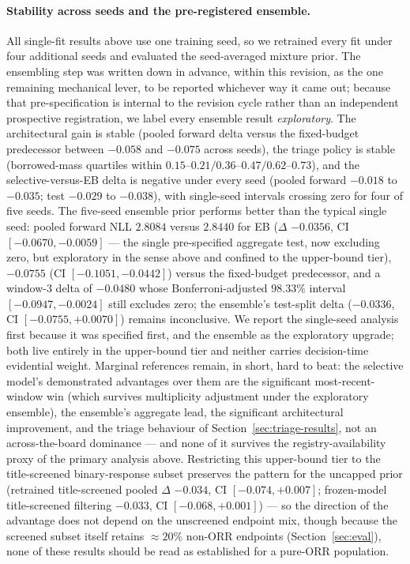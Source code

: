 \documentclass[11pt]{article}
\begin{document}
\paragraph{Stability across seeds and the pre-registered ensemble.} All
single-fit results above use one training seed, so we retrained every fit
under four additional seeds and evaluated the seed-averaged mixture prior.
The ensembling step was written down in advance, within this revision, as the
one remaining mechanical lever, to be reported whichever way it came out;
because that pre-specification is internal to the revision cycle rather than
an independent prospective registration, we label every ensemble result
\emph{exploratory}. The architectural
gain is stable (pooled forward delta versus the fixed-budget predecessor
between $-0.058$ and $-0.075$ across seeds), the triage policy is stable
(borrowed-mass quartiles within $0.15$--$0.21 / 0.36$--$0.47 / 0.62$--$0.73$),
and the selective-versus-EB delta is negative under every seed (pooled
forward $-0.018$ to $-0.035$; test $-0.029$ to $-0.038$), with single-seed
intervals crossing zero for four of five seeds. The five-seed ensemble prior
performs better than the typical single seed: pooled forward NLL $2.8084$
versus $2.8440$ for EB ($\Delta$ $-0.0356$, CI $[-0.0670,-0.0059]$ --- the
single pre-specified aggregate test, now excluding zero, but exploratory in
the sense above and confined to the upper-bound tier), $-0.0755$
(CI $[-0.1051,-0.0442]$) versus the fixed-budget predecessor, and a window-3
delta of $-0.0480$ whose Bonferroni-adjusted $98.33\%$ interval
$[-0.0947,-0.0024]$ still excludes zero; the ensemble's test-split delta
($-0.0336$, CI $[-0.0755,+0.0070]$) remains inconclusive. We report the
single-seed analysis first because it was specified first, and the ensemble
as the exploratory upgrade; both live entirely in the upper-bound tier and
neither carries decision-time evidential weight. Marginal
references remain, in short, hard to beat: the selective model's demonstrated
advantages over them are the significant most-recent-window win (which
survives multiplicity adjustment under the exploratory ensemble), the
ensemble's aggregate lead, the
significant architectural improvement, and the triage behaviour
of Section~\ref{sec:triage-results}, not an across-the-board dominance ---
and none of it survives the registry-availability proxy of the primary
analysis above. Restricting this upper-bound tier to the title-screened binary-response
subset preserves the pattern for the uncapped prior (retrained
title-screened pooled $\Delta$ $-0.034$, CI $[-0.074,+0.007]$; frozen-model
title-screened filtering $-0.033$, CI $[-0.068,+0.001]$) --- so the
direction of the advantage does not depend on the unscreened endpoint mix,
though because the screened subset itself retains $\approx 20\%$ non-ORR
endpoints (Section~\ref{sec:eval}), none of these results should be read
as established for a pure-ORR population.
\end{document}
